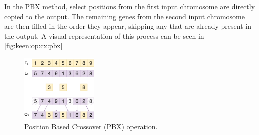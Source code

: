 In the PBX method, select positions from the first input chromosome are directly copied to the output. The remaining 
genes from the second input chromosome are then filled in the order they appear, skipping any that are already present 
in the output. A visual representation of this process can be seen in \vref{fig:keen:op:cx:pbx}

\begin{figure}[ht!]
\centering
\includegraphics[width=0.33\textwidth]{img/keen/PBX.png}
\caption{Position Based Crossover (PBX) operation.}
\label{fig:keen:op:cx:pbx}
\end{figure}
